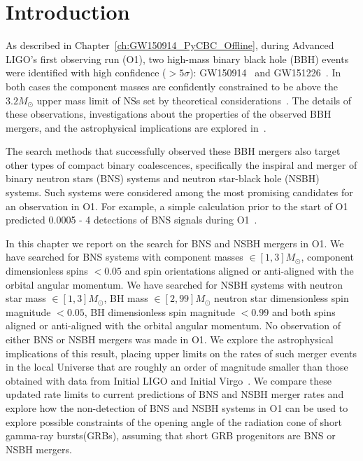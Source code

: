 
%
\section{Introduction}
As described in Chapter~\ref{ch:GW150914_PyCBC_Offline}, during Advanced LIGO's first observing run (\ac{O1}),
two high-mass binary
black hole (\ac{BBH}) events
were identified with high confidence ($> 5 \sigma$): GW150914~\citep{Abbott:2016blz} and
GW151226~\citep{Abbott:2016nmj}. 
In both cases the component masses are confidently constrained to be above the $3.2M_\odot$ upper mass limit of \acp{NS} set
by theoretical considerations~\citep{Rhoades:1974fn,TheLIGOScientific:2016wfe}.
The details of these observations, investigations about the properties
of the observed \ac{BBH} mergers, and the astrophysical implications are explored
in~\citep{TheLIGOScientific:2016wfe,Abbott:2016nhf,TheLIGOScientific:2016htt,TheLIGOScientific:2016src,TheLIGOScientific:2016pea, Abbott:2016izl}.

The search methods that successfully observed these \ac{BBH} mergers also target other types of compact
binary coalescences, specifically the inspiral and merger of binary neutron stars (\ac{BNS}) systems 
and neutron star-black hole (\ac{NSBH}) systems. Such systems were considered
among the most promising candidates for an observation in \ac{O1}. For example, a simple calculation
prior to the start of O1 predicted 0.0005 - 4 detections of \ac{BNS}
signals during O1~\citep{Aasi:2013wya}.

In this chapter we report on the search for \ac{BNS} and \ac{NSBH} mergers in \ac{O1}. We have
searched for \ac{BNS} systems with component masses $\in [1,3] M_{\odot}$, component dimensionless
spins $< 0.05$ and spin orientations aligned or anti-aligned with the orbital angular momentum.
We have searched for \ac{NSBH} systems with neutron star mass $\in [1,3] M_{\odot}$,
\ac{BH} mass $\in [2,99] M_{\odot}$ neutron star dimensionless spin magnitude $< 0.05$,
\ac{BH} dimensionless spin magnitude $<0.99$ and both spins
aligned or anti-aligned with the orbital angular momentum.
No observation of
either \ac{BNS} or \ac{NSBH} mergers was made in \ac{O1}. We explore the astrophysical implications
of this result, placing upper limits on the rates of such merger events in the
local Universe that
are roughly an order of magnitude smaller than those obtained with data from Initial \ac{LIGO}
and Initial Virgo~\citep{Abbott:2007kv,Acernese:2008zzf,Colaboration:2011np}.
We compare these updated rate limits to current predictions of \ac{BNS} and
\ac{NSBH} merger rates and explore how the non-detection of \ac{BNS} and \ac{NSBH} systems in \ac{O1} can be used
to explore possible constraints of the opening angle of the radiation cone of short gamma-ray bursts(\acp{GRB}),
assuming that short \ac{GRB} progenitors are \ac{BNS} or \ac{NSBH} mergers.

